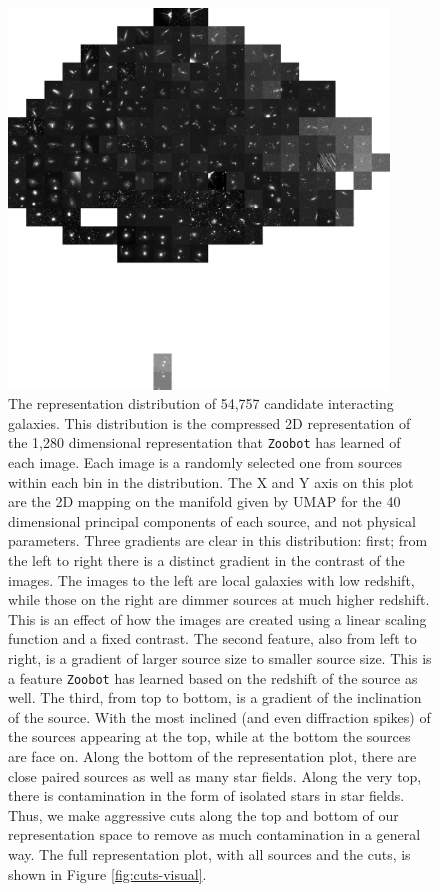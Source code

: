 {\begin{figure}
  \centering
  \includegraphics[width=0.90\textwidth]{Chapter2/figures/fig7.jpeg}
  \caption[The representation distribution of 54,757 candidate interacting galaxies.]{The representation distribution of 54,757 candidate interacting galaxies. This distribution is the compressed 2D representation of the 1,280 dimensional representation that \texttt{Zoobot} has learned of each image. Each image is a randomly selected one from sources within each bin in the distribution. The X and Y axis on this plot are the 2D mapping on the manifold given by UMAP for the 40 dimensional principal components of each source, and not physical parameters. Three gradients are clear in this distribution: first; from the left to right there is a distinct gradient in the contrast of the images. The images to the left are local galaxies with low redshift, while those on the right are dimmer sources at much higher redshift. This is an effect of how the images are created using a linear scaling function and a fixed contrast. The second feature, also from left to right, is a gradient of larger source size to smaller source size. This is a feature \texttt{Zoobot} has learned based on the redshift of the source as well. The third, from top to bottom, is a gradient of the inclination of the source. With the most inclined (and even diffraction spikes) of the sources appearing at the top, while at the bottom the sources are face on. Along the bottom of the representation plot, there are close paired sources as well as many star fields. Along the very top, there is contamination in the form of isolated stars in star fields. Thus, we make aggressive cuts along the top and bottom of our representation space to remove as much contamination in a general way. The full representation plot, with all sources and the cuts, is shown in Figure \ref{fig:cuts-visual}. }
  \label{fig:representations}
\end{figure}

}
